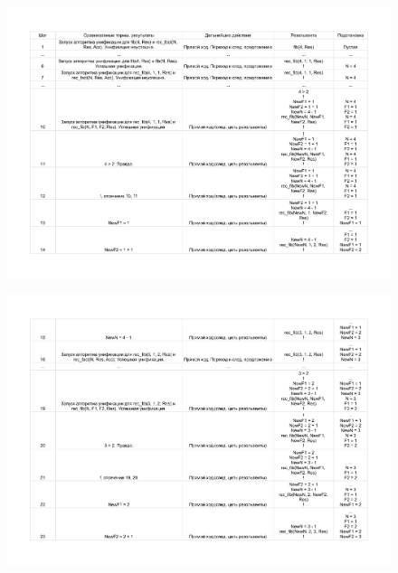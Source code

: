 \documentclass[12pt]{report}
\begin{document}
\begin{figure}[H]
	\begin{center}
		\includegraphics[scale=0.7]{imgs/table_16_02-1.pdf}
	\end{center}
\end{figure}

\begin{figure}[H]
	\begin{center}
		\includegraphics[scale=0.7]{imgs/table_16_02-2.pdf}
	\end{center}
\end{figure}
\end{document}
